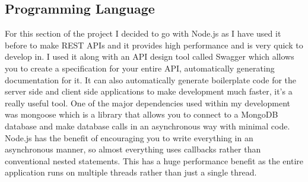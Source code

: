 \subsection{Programming Language}
For this section of the project I decided to go with Node.js as I have used it before to make REST APIs and it provides high performance and is very quick to develop in. I used it along with an API design tool called Swagger which allows you to create a specification for your entire API, automatically generating documentation for it. It can also automatically generate boilerplate code for the server side and client side applications to make development much faster, it's a really useful tool. One of the major dependencies used within my development was mongoose which is a library that allows you to connect to a MongoDB database and make database calls in an asynchronous way with minimal code. Node.js has the benefit of encouraging you to write everything in an asynchronous manner, so almost everything uses callbacks rather than conventional nested statements. This has a huge performance benefit as the entire application runs on multiple threads rather than just a single thread.

